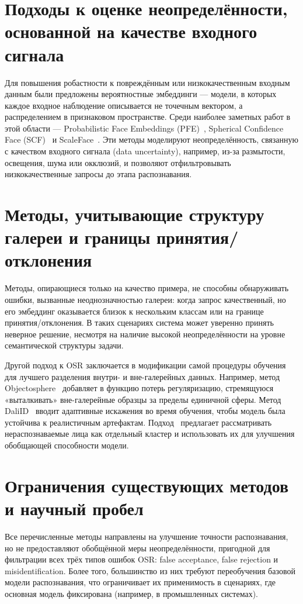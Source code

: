 \section{Подходы к оценке неопределённости, основанной на качестве входного сигнала}\label{sec:related_work/data_uncertainty}
Для повышения робастности к повреждённым или низкокачественным входным данным были предложены вероятностные эмбеддинги — модели, в которых каждое входное наблюдение описывается не точечным вектором, а распределением в признаковом пространстве.  
Среди наиболее заметных работ в этой области — Probabilistic Face Embeddings (PFE)~\cite{pfe}, Spherical Confidence Face (SCF)~\cite{scf} и ScaleFace~\cite{scaleface}.  
Эти методы моделируют неопределённость, связанную с качеством входного сигнала (data uncertainty), например, из-за размытости, освещения, шума или окклюзий, и позволяют отфильтровывать низкокачественные запросы до этапа распознавания.  
\section{Методы, учитывающие структуру галереи и границы принятия/отклонения}\label{sec:related_work/gallery_and_boundary}
Методы, опирающиеся только на качество примера, не способны обнаруживать ошибки, вызванные неоднозначностью галереи: когда запрос качественный, но его эмбеддинг оказывается близок к нескольким классам или на границе принятия/отклонения.  
В таких сценариях система может уверенно принять неверное решение, несмотря на наличие высокой неопределённости на уровне семантической структуры задачи.  

Другой подход к OSR заключается в модификации самой процедуры обучения для лучшего разделения внутри- и вне-галерейных данных.  
Например, метод Objectosphere~\cite{objectosphere} добавляет в функцию потерь регуляризацию, стремящуюся «выталкивать» вне-галерейные образцы за пределы единичной сферы.  
Метод DaliID~\cite{daliid} вводит адаптивные искажения во время обучения, чтобы модель была устойчива к реалистичным артефактам.  
Подход~\cite{deng2023harnessing} предлагает рассматривать нераспознаваемые лица как отдельный кластер и использовать их для улучшения обобщающей способности модели.  

\section{Ограничения существующих методов и научный пробел}\label{sec:related_work/research_gap}
Все перечисленные методы направлены на улучшение точности распознавания, но не предоставляют обобщённой меры неопределённости, пригодной для фильтрации всех трёх типов ошибок OSR: false acceptance, false rejection и misidentification.  
Более того, большинство из них требуют переобучения базовой модели распознавания, что ограничивает их применимость в сценариях, где основная модель фиксирована (например, в промышленных системах).  

